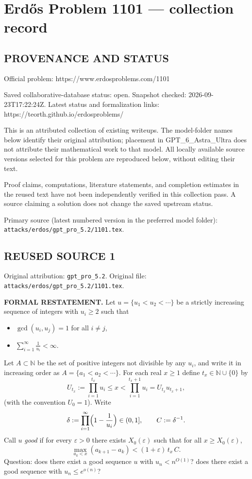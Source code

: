 \section*{Erd\H{o}s Problem 1101 --- collection record}

\subsection*{PROVENANCE AND STATUS}
Official problem: https://www.erdosproblems.com/1101

Saved collaborative-database status: open.
Snapshot checked: 2026-09-23T17:22:24Z.
Latest status and formalization links: https://teorth.github.io/erdosproblems/

This is an attributed collection of existing writeups. The model-folder names below identify their original attribution; placement in GPT\_6\_Astra\_Ultra does not attribute their mathematical work to that model. All locally available source versions selected for this problem are reproduced below, without editing their text.

Proof claims, computations, literature statements, and completion estimates in the reused text have not been independently verified in this collection pass. A source claiming a solution does not change the saved upstream status.

Primary source (latest numbered version in the preferred model folder): \texttt{attacks/erdos/gpt\_pro\_5.2/1101.tex}.

\subsection*{REUSED SOURCE 1}
Original attribution: \texttt{gpt\_pro\_5.2}.
Original file: \texttt{attacks/erdos/gpt\_pro\_5.2/1101.tex}.


\noindent\textbf{FORMAL RESTATEMENT.}
Let $u=\{u_1<u_2<\cdots\}$ be a strictly increasing sequence of integers with $u_i\ge 2$ such that
\begin{itemize}
\item $\gcd(u_i,u_j)=1$ for all $i\ne j$,
\item $\sum_{i=1}^{\infty}\frac{1}{u_i}<\infty$.
\end{itemize}
Let $A\subset\mathbb N$ be the set of positive integers not divisible by any $u_i$, and write it in increasing order as
$A=\{a_1<a_2<\cdots\}$.
For each real $x\ge 1$ define $t_x\in\mathbb N\cup\{0\}$ by
\[
U_{t_x}:=\prod_{i=1}^{t_x}u_i\le x < \prod_{i=1}^{t_x+1}u_i=U_{t_x}u_{t_x+1},
\]
(with the convention $U_0=1$).
Write
\[\delta:=\prod_{i=1}^{\infty}\Bigl(1-\frac{1}{u_i}\Bigr)\in(0,1],\qquad C:=\delta^{-1}.
\]
Call $u$ \emph{good} if for every $\varepsilon>0$ there exists $X_0(\varepsilon)$ such that for all $x\ge X_0(\varepsilon)$,
\[
\max_{a_k<x}(a_{k+1}-a_k) < (1+\varepsilon)\,t_x\,C.
\]
Question: does there exist a good sequence $u$ with $u_n<n^{O(1)}$? does there exist a good sequence with $u_n\le e^{o(n)}$?

